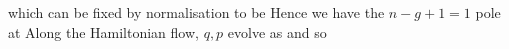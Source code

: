 \documentclass{article}
\begin{document}
which can be fixed by normalisation to be 
Hence we have the $n-g+1 =1 $ pole at 
Along the Hamiltonian flow, $q,p$ evolve as 
and so 


\end{document}
